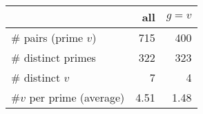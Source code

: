 \begin{table}[ht]
    \centering
    \begin{tabular}{lrr}
        \toprule
                                  & all  &  $g = v$  \\ \midrule
        \# pairs (prime $v$)      & 715  & 400       \\ 
        \# distinct primes        & 322  & 323       \\ 
        \# distinct $v$           & 7    & 4         \\
        \#$v$ per prime (average) & 4.51 & 1.48      \\ \bottomrule
    \end{tabular}
    \label{tab:experiments}
\end{table}